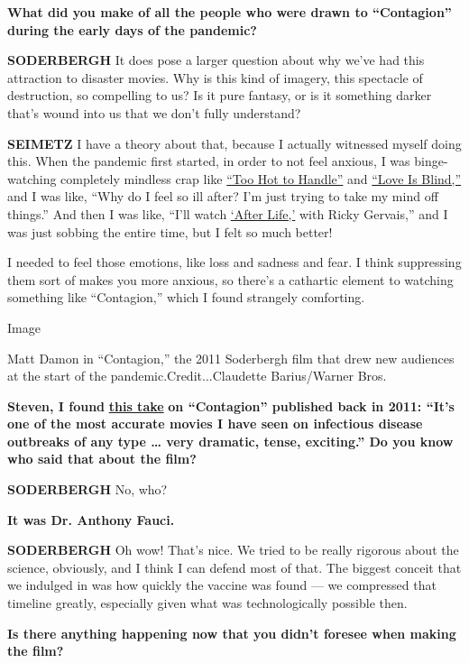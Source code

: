 \textbf{What did you make of all the people who were drawn to
``Contagion'' during the early days of the pandemic?}

\textbf{SODERBERGH} It does pose a larger question about why we've had
this attraction to disaster movies. Why is this kind of imagery, this
spectacle of destruction, so compelling to us? Is it pure fantasy, or is
it something darker that's wound into us that we don't fully understand?

\textbf{SEIMETZ} I have a theory about that, because I actually
witnessed myself doing this. When the pandemic first started, in order
to not feel anxious, I was binge-watching completely mindless crap like
\href{https://www.netflix.com/title/80241027}{``Too Hot to Handle''} and
\href{https://www.netflix.com/title/80996601}{``Love Is Blind,''} and I
was like, ``Why do I feel so ill after? I'm just trying to take my mind
off things.'' And then I was like, ``I'll watch
\href{https://www.netflix.com/title/80998491}{`After Life,'} with Ricky
Gervais,'' and I was just sobbing the entire time, but I felt so much
better!

I needed to feel those emotions, like loss and sadness and fear. I think
suppressing them sort of makes you more anxious, so there's a cathartic
element to watching something like ``Contagion,'' which I found
strangely comforting.

Image

Matt Damon in ``Contagion,'' the 2011 Soderbergh film that drew new
audiences at the start of the pandemic.Credit...Claudette Barius/Warner
Bros.

\textbf{Steven, I found}
\textbf{\href{https://www.cidrap.umn.edu/news-perspective/2011/09/contagion-portrays-extreme-not-impossible-scenario}{this
take}} \textbf{on ``Contagion'' published back in 2011: ``It's one of
the most accurate movies I have seen on infectious disease outbreaks of
any type \ldots{} very dramatic, tense, exciting.'' Do you know who said
that about the film?}

\textbf{SODERBERGH} No, who?

\textbf{It was Dr. Anthony Fauci.}

\textbf{SODERBERGH} Oh wow! That's nice. We tried to be really rigorous
about the science, obviously, and I think I can defend most of that. The
biggest conceit that we indulged in was how quickly the vaccine was
found --- we compressed that timeline greatly, especially given what was
technologically possible then.

\textbf{Is there anything happening now that you didn't foresee when
making the film?}

